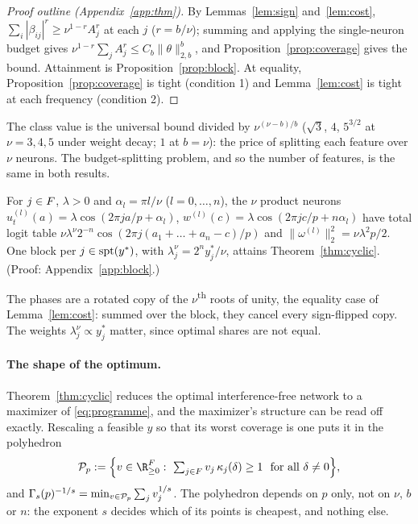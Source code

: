 \begin{proof}[Proof outline (Appendix~\ref{app:thm})]
By Lemmas~\ref{lem:sign} and~\ref{lem:cost}, $\sum_i|\beta_{ij}|^r\ge\nu^{1-r}A_j^r$ at each $j$ ($r=b/\nu$); summing and applying the single-neuron budget gives $\nu^{1-r}\sum_jA_j^r\le C_b\|\theta\|_{2,b}^b$, and Proposition~\ref{prop:coverage} gives the bound. Attainment is Proposition~\ref{prop:block}. At equality, Proposition~\ref{prop:coverage} is tight (condition 1) and Lemma~\ref{lem:cost} is tight at each frequency (condition 2).
\end{proof}

The class value is the universal bound divided by $\nu^{(\nu-b)/b}$ ($\sqrt3$, $4$, $5^{3/2}$ at $\nu=3,4,5$ under weight decay; $1$ at $b=\nu$): the price of splitting each feature over $\nu$ neurons. The budget-splitting problem, and so the number of features, is the same in both results.

\begin{proposition}\label{prop:block}
For $j\in F$, $\lambda>0$ and $\alpha_l=\pi l/\nu$ ($l=0,\dots,n$), the $\nu$ product neurons $u^{(l)}_t(a)=\lambda\cos(2\pi ja/p+\alpha_l)$, $w^{(l)}(c)=\lambda\cos(2\pi jc/p+n\alpha_l)$ have total logit table $\nu\lambda^\nu2^{-n}\cos(2\pi j(a_1+\dots+a_n-c)/p)$ and $\|\omega^{(l)}\|_2^2=\nu\lambda^2p/2$. One block per $j\in\mathrm{spt}(y^*)$, with $\lambda_j^\nu=2^ny^*_j/\nu$, attains Theorem~\ref{thm:cyclic}. (Proof: Appendix~\ref{app:block}.)
\end{proposition}

The phases are a rotated copy of the $\nu$\textsuperscript{th} roots of unity, the equality case of Lemma~\ref{lem:cost}: summed over the block, they cancel every sign-flipped copy. The weights $\lambda_j^\nu\propto y^*_j$ matter, since optimal shares are not equal.

\paragraph{The shape of the optimum.}
Theorem~\ref{thm:cyclic} reduces the optimal interference-free network to a maximizer of \eqref{eq:programme}, and the maximizer's structure can be read off exactly. Rescaling a feasible $y$ so that its worst coverage is one puts it in the polyhedron
\[
\curlyp_p:=\Big\{v\in\R_{\ge0}^{\Fp}:\ \textstyle\sum_{j\in\Fp}v_j\,\cov{j}{\delta}\ge1\ \text{ for all }\delta\neq0\Big\},
\]
and $\Gamma_s(p)^{-1/s}=\min_{v\in\mathcal{P}_p}\sum_jv_j^{1/s}$. The polyhedron depends on $p$ only, not on $\nu$, $b$ or $n$: the exponent $s$ decides which of its points is cheapest, and nothing else.

